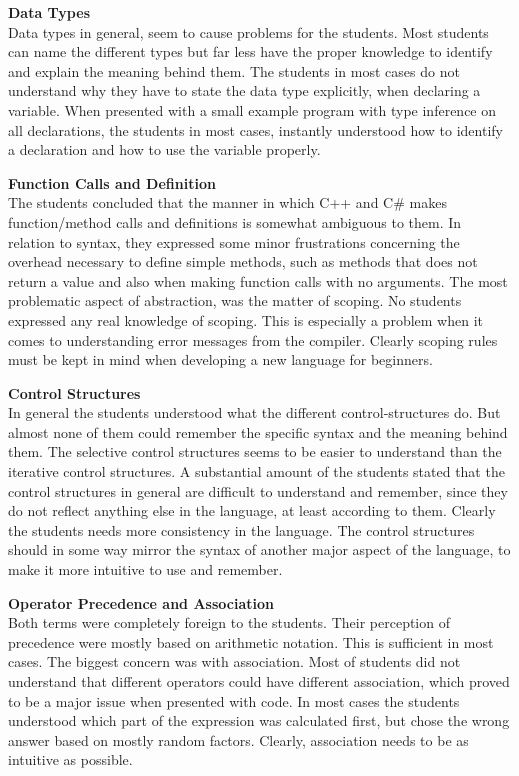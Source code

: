 \textbf{Data Types}\\
Data types in general, seem to cause problems for the students. 
Most students can name the different types but far less have the proper knowledge to identify and explain the meaning behind them. 
The students in most cases do not understand why they have to state the data type explicitly, when declaring a variable. 
When presented with a small example program with type inference on all declarations, the students in most cases, instantly understood how to identify a declaration and how to use the variable properly.

\textbf{Function Calls and Definition}\\
The students concluded that the manner in which C++ and C{\#} makes function/method calls and definitions is somewhat ambiguous to them. 
In relation to syntax, they expressed some minor frustrations concerning the overhead necessary to define simple methods, such as methods that does not return a value and also when making function calls with no arguments. 
The most problematic aspect of abstraction, was the matter of scoping. 
No students expressed any real knowledge of scoping. 
This is especially a problem when it comes to understanding error messages from the compiler. 
Clearly scoping rules must be kept in mind when developing a new language for beginners.

\textbf{Control Structures}\\
In general the students understood what the different control-structures do. 
But almost none of them could remember the specific syntax and the meaning behind them. 
The selective control structures seems to be easier to understand than the iterative control structures. 
A substantial amount of the students stated that the control structures in general are difficult to understand and remember, since they do not reflect anything else in the language, at least according to them.
Clearly the students needs more consistency in the language. 
The control structures should in some way mirror the syntax of another major aspect of the language, to make it more intuitive to use and remember.

\textbf{Operator Precedence and Association}\\
Both terms were completely foreign to the students. 
Their perception of precedence were mostly based on arithmetic notation. 
This is sufficient in most cases. 
The biggest concern was with association. 
Most of students did not understand that different operators could have different association, which proved to be a major issue when presented with code. 
In most cases the students understood which part of the expression was calculated first, but chose the wrong answer based on mostly random factors. 
Clearly, association needs to be as intuitive as possible.

